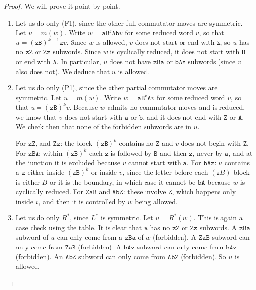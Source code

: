 \documentclass[10pt,a4paper]{amsart}
\begin{document}
	\begin{proof}\leavevmode We will prove it point by point.
		\begin{enumerate}
			\item Let us do only (F1), since the other full commutator moves are symmetric.
			Let $u=m(w)$.
			Write $w=\mathtt{aB}^k\mathtt{A b} v$ for some reduced word $v$, so that $u=(\mathtt{zB})^{k-1}\mathtt{z}v$.
			Since $w$ is allowed, $v$ does not start or end with $\mathtt{Z}$, so $u$ has no $\mathtt{zZ}$ or $\mathtt{Z z}$ subwords.
			Since $w$ is cyclically reduced, it does not start with $\mathtt{B}$ or end with $\mathtt{A}$.
			In particular, $u$ does not have $\mathtt{zB a}$ or $\mathtt{bA z}$ subwords (since $v$ also does not).
			We deduce that $u$ is allowed.
			\item Let us do only (P1), since the other partial commutator moves are symmetric.
			Let $u=m(w)$.
			Write $w=\mathtt{aB}^k\mathtt{A} v$ for some reduced word $v$, so that $u=(\mathtt{zB})^k v$.
			Because $w$ admits no commutator moves and is reduced, we know that $v$ does not start with $\mathtt{a}$ or $\mathtt{b}$, and it does not end with $\mathtt{Z}$ or $\mathtt{A}$. We check then that none of the forbidden subwords are in $u$.
			
			For $\mathtt{zZ}$, and $\mathtt{Zz}$: the block $(\mathtt{zB})^k$ contains no $\mathtt{Z}$ and $v$ does not begin with $\mathtt{Z}$. For $\mathtt{zBA}$: within $(\mathtt{zB})^k$ each $\mathtt{z}$ is followed by $\mathtt{B}$ and then $\mathtt{z}$, never by $\mathtt{a}$, and at the junction it is excluded because $v$ cannot start with $\mathtt{a}$. For $\mathtt{bAz}$: $u$ contains a $\mathtt{z}$ either inside $(\mathtt{zB})^k$ or inside $v$, since the letter before each $(\mathtt{z}B)$-block is either $B$ or it is the boundary, in which case it cannot be $\mathtt{bA}$ because $w$ is cyclically reduced. For $\mathtt{ZaB}$ and $\mathtt{AbZ}$: these involve $\mathtt{Z}$, which happens only inside $v$, and then it is controlled by $w$ being allowed.
			
			
			\item Let us do only $R^*$, since $L^*$ is symmetric.
			Let $u=R^*(w)$.
			This is again a case check using the table.
			It is clear that $u$ has no $\mathtt{zZ}$ or $\mathtt{Z z}$ subwords.
			A $\mathtt{zB a}$ subword of $u$ can only come from a $\mathtt{zB a}$ of $w$ (forbidden).
			A $\mathtt{Z aB}$ subword can only come from $\mathtt{Z aB}$ (forbidden).
			A $\mathtt{bA z}$ subword can only come from $\mathtt{bA z}$ (forbidden).
			An $\mathtt{A bZ}$ subword can only come from $\mathtt{A bZ}$ (forbidden).
			So $u$ is allowed. \qedhere
		\end{enumerate}
	\end{proof}
\end{document}
